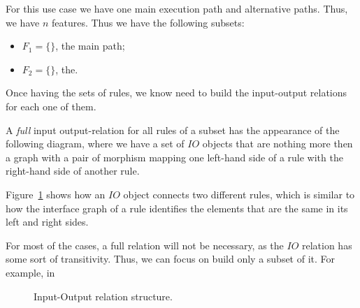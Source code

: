 \begin{example}
\begin{figure}[!ht]
\end{figure}

  For this use case we have one main execution path and  alternative paths. Thus, we have $n$ features.
  Thus we have the following subsets:
  \begin{itemize}
    \item $F_1 = \{\}$, the main path;
    \item $F_2 = \{\}$, the.
  \end{itemize} 
\end{example}

Once having the sets of rules, we know need to build the input-output relations for each one of them.

\begin{example}\label{ex:inout} A \emph{full} input output-relation for all rules of a subset has the appearance of the following diagram, where we have a set of $IO$ objects that are nothing more then a graph with a pair of morphism mapping one left-hand side of a rule with the right-hand side of another rule.

\hfill\break

    Figure~\ref{fig:tests:inout} shows how an $IO$ object connects two different rules, which is similar to how the interface graph of a rule identifies the elements that are the same in its left and right sides.

    For most of the cases, a full relation will not be necessary, as the $IO$ relation has some sort of transitivity. Thus, we can focus on build only a subset of it. For example, in 

\begin{figure}[!ht]
  \centering
  \caption{Input-Output relation structure.}\label{fig:tests:inout}
\end{figure}

\end{example}

